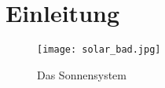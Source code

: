 \section{Einleitung}
\label{sec:Einleitung}
\blindtext
\begin{figure}[h]
	\texttt{[image: solar\_bad.jpg]}
	\caption{Das Sonnensystem}
	\label{fig:das-sonnensystem}
\end{figure}